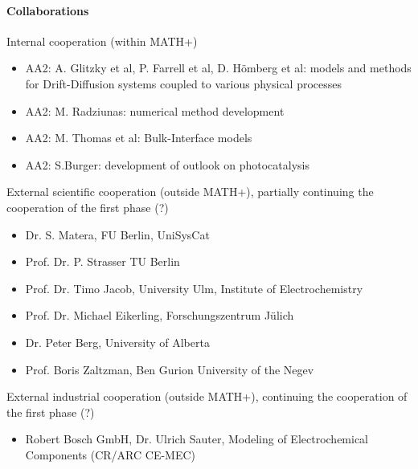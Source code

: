 \documentclass[a4paper,10pt]{article}
\begin{document}
\paragraph{Collaborations}

Internal cooperation (within MATH+)
\begin{itemize}
\item AA2: A. Glitzky  et al, P. Farrell et al, D. Hömberg et al: models and methods for Drift-Diffusion systems coupled
  to various physical processes
\item AA2: M. Radziunas: numerical method development
\item AA2: M. Thomas et al: Bulk-Interface models
\item AA2: S.Burger: development of outlook on photocatalysis
\end{itemize}

External scientific cooperation (outside MATH+),
partially continuing the cooperation of the first phase (?)
\begin{itemize}
\item Dr. S. Matera, FU Berlin, UniSysCat
\item Prof. Dr. P. Strasser TU Berlin
\item Prof. Dr. Timo Jacob, University Ulm, Institute of Electrochemistry     
\item Prof. Dr. Michael Eikerling, Forschungszentrum Jülich
\item Dr. Peter Berg, University of Alberta
\item Prof. Boris Zaltzman, Ben Gurion University of the Negev
\end{itemize}

External industrial cooperation (outside MATH+),
continuing the cooperation of the first phase (?)
\begin{itemize}
\item Robert Bosch GmbH, Dr. Ulrich Sauter, Modeling of Electrochemical Components (CR/ARC CE-MEC) 
\end{itemize}
\end{document}
